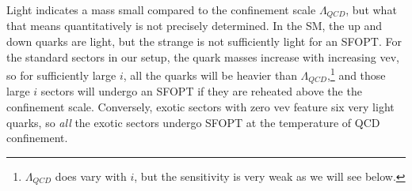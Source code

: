 \documentclass[nofootinbib,twocolumn,preprintnumbers]{revtex4-1}
\begin{document}
Light indicates a mass small compared to the confinement scale $\Lambda_{QCD}$, but what that means quantitatively is not precisely determined. In the SM, the up and down quarks are light, but the strange is not sufficiently light for an SFOPT.
%
For the standard sectors in our setup, the quark masses increase with increasing vev, so for sufficiently large $i$, all the quarks will be heavier than $\Lambda_{QCD}$,\footnote{$\Lambda_{QCD}$ does vary with $i$, but the sensitivity is very weak as we will see below.} and those large $i$ sectors will undergo an SFOPT if they are reheated above the the confinement scale. 
Conversely, exotic sectors with zero vev feature six very light quarks, so \textit{all} the exotic sectors undergo SFOPT at the temperature of QCD confinement. 
\end{document}
